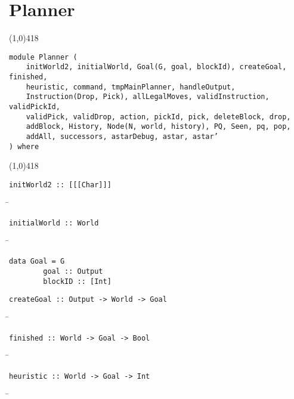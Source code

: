 \section{Planner}
\begin{center}
\line(1,0){418}
\end{center}
\begin{verbatim}
module Planner (
    initWorld2, initialWorld, Goal(G, goal, blockId), createGoal, finished,
    heuristic, command, tmpMainPlanner, handleOutput,
    Instruction(Drop, Pick), allLegalMoves, validInstruction, validPickId,
    validPick, validDrop, action, pickId, pick, deleteBlock, drop,
    addBlock, History, Node(N, world, history), PQ, Seen, pq, pop,
    addAll, successors, astarDebug, astar, astar’
) where
\end{verbatim}
\begin{center}
\line(1,0){418}
\end{center}
\begin{verbatim}
initWorld2 :: [[[Char]]]
\end{verbatim}
\begin{tabbing}
\hspace*{1cm}\= \kill
\> 
\end{tabbing}
\begin{verbatim}
initialWorld :: World
\end{verbatim}
\begin{tabbing}
\hspace*{1cm}\= \kill
\> 
\end{tabbing}
\begin{verbatim}
data Goal = G
        goal :: Output
        blockID :: [Int]
\end{verbatim}
\begin{verbatim}
createGoal :: Output -> World -> Goal
\end{verbatim}
\begin{tabbing}
\hspace*{1cm}\= \kill
\> 
\end{tabbing}
\begin{verbatim}
finished :: World -> Goal -> Bool
\end{verbatim}
\begin{tabbing}
\hspace*{1cm}\= \kill
\> 
\end{tabbing}
\begin{verbatim}
heuristic :: World -> Goal -> Int
\end{verbatim}
\begin{tabbing}
\hspace*{1cm}\= \kill
\> 
\end{tabbing}
